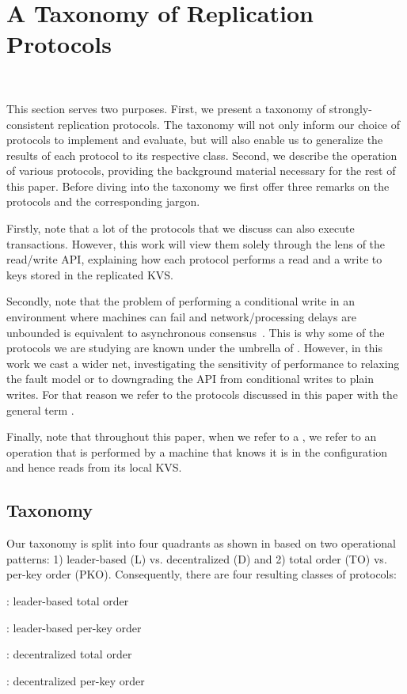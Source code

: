 \section{A Taxonomy of Replication Protocols}~\label{sec:tax}

This section serves two purposes.
First, we present a taxonomy of strongly-consistent replication protocols.
The taxonomy will not only inform our choice of protocols to implement and evaluate, but will also enable us to generalize the results of each protocol to its respective class.
Second, we describe the operation of various protocols, providing the background material necessary for the rest of this paper.
Before diving into the taxonomy we first offer three remarks on the protocols and the corresponding jargon.

Firstly, note that a lot of the protocols that we discuss can also execute transactions. However, this work will view them solely through the lens of the read/write API, explaining how each protocol performs a read and a write to keys stored in the replicated KVS.

Secondly, note that the problem of performing a conditional write in an environment where machines can fail and network/processing delays are unbounded is equivalent to asynchronous consensus~\cite{Herlihy:2008}. 
This is why some of the protocols we are studying are known under the umbrella of . 
However, in this work we cast a wider net, investigating the sensitivity of performance to relaxing the fault model or to 
downgrading the API from conditional writes to plain writes.
For that reason we refer to the protocols discussed in this paper with the general term .

Finally, note that throughout this paper, when we refer to a , we refer to an operation that is performed by a machine that knows it is in the configuration and hence reads from its local KVS.  

\subsection{Taxonomy}

Our taxonomy is split into four quadrants as shown in  based on two operational patterns: 1) leader-based (L) vs. decentralized (D) and 2) total order (TO) vs. per-key order (PKO). Consequently, there are four resulting classes of protocols:
\squishenum
\item \emph{\LTO}: leader-based total order 
\item \emph{\LPKO}: leader-based per-key order
\item \emph{\DTO}: decentralized total order 
\item \emph{\DPKO}: decentralized per-key order
\squishenumend

